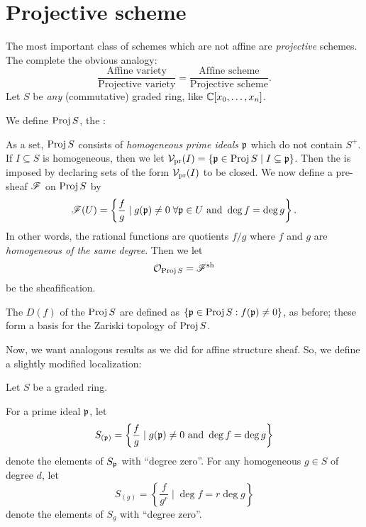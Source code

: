 \section{Projective scheme}
The most important class of schemes which are not affine are
\emph{projective} schemes.
The complete the obvious analogy:
\[
	\frac{\text{Affine variety}}{\text{Projective variety}}
	= 
	\frac{\text{Affine scheme}}{\text{Projective scheme}}.
\]
Let $S$ be \emph{any} (commutative) graded ring, like $\mathbb C[x_0, \dots, x_n]$.
\begin{definition}
	We define $\operatorname{Proj} S$, the :
	\begin{itemize}
		\ii As a set, $\operatorname{Proj} S$ consists of \emph{homogeneous prime ideals}
		$\mathfrak p$ which do not contain $S^+$.
		\ii If $I \subseteq S$ is homogeneous, then
		we let $\mathcal V_{\text{pr}}(I) = \{ \mathfrak p \in \operatorname{Proj} S \mid I \subseteq \mathfrak p \}$.
		Then the  is imposed by declaring 
		sets of the form $\mathcal V_{\text{pr}}(I)$ to be closed.
		\ii We now define a pre-sheaf $\mathscr F$ on $\operatorname{Proj} S$ by
		\[ \mathscr F(U) = 
			\left\{ \frac{f}{g} \mid 
			g(\mathfrak p) \neq 0 \; \forall \mathfrak p \in U \text{ and }
			\deg f = \deg g \right\}.
		\]
		In other words, the rational functions are quotients $f/g$
		where $f$ and $g$ are \emph{homogeneous of the same degree}.
		Then we let \[ \mathcal O_{\operatorname{Proj} S} = \mathscr F^\mathrm{sh} \] be the sheafification.
	\end{itemize}
\end{definition}
\begin{definition}
	The  $D(f)$ of the $\operatorname{Proj} S$
	are defined as $\left\{ \mathfrak p \in \operatorname{Proj} S : f(\mathfrak p) \neq 0 \right\}$,
	as before; these form a basis for the Zariski topology of $\operatorname{Proj} S$.
\end{definition}
Now, we want analogous results as we did for affine structure sheaf.
So, we define a slightly modified localization:
\begin{definition}
	Let $S$ be a graded ring.
	\begin{enumerate}[(i)]
		\ii For a prime ideal $\mathfrak p$, let
		\[ S_{(\mathfrak p)} = \left\{ \frac fg \mid g(\mathfrak p) \neq 0 \text{ and }
			\deg f = \deg g \right\} \]
		denote the elements of $S_\mathfrak p$ with ``degree zero''.
		\ii For any homogeneous $g \in S$ of degree $d$, let
		\[ S_{(g)} = \left\{ \frac{f}{g^r} \mid 
			\deg f = r \deg g \right\} \]
		denote the elements of $S_g$ with ``degree zero''.
	\end{enumerate}
\end{definition}

